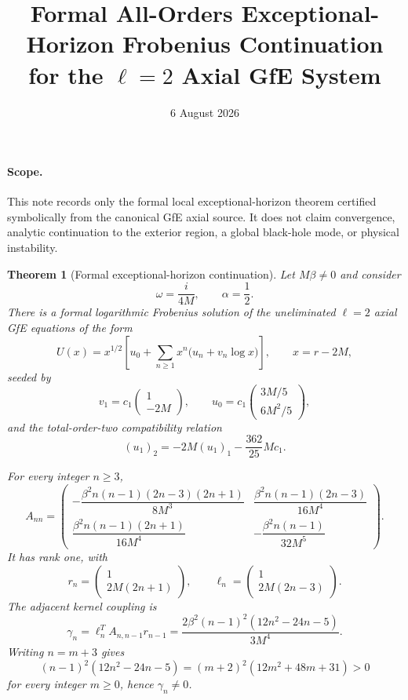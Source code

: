 \documentclass[11pt]{article}
\newtheorem{theorem}{Theorem}
\begin{document}
\title{Formal All-Orders Exceptional-Horizon Frobenius Continuation\\
for the $\ell=2$ Axial GfE System}
\date{6 August 2026}
\maketitle

\paragraph{Scope.}
This note records only the formal local exceptional-horizon theorem
certified symbolically from the canonical GfE axial source. It does not
claim convergence, analytic continuation to the exterior region, a
global black-hole mode, or physical instability.

\begin{theorem}[Formal exceptional-horizon continuation]
Let $M\beta\neq0$ and consider
\[
  \omega=\frac{i}{4M},
  \qquad
  \alpha=\frac12 .
\]
There is a formal logarithmic Frobenius solution of the uneliminated
$\ell=2$ axial GfE equations of the form
\[
  U(x)
  =
  x^{1/2}
  \left[
    u_0+
    \sum_{n\ge1}x^n
      \bigl(u_n+v_n\log x\bigr)
  \right],
  \qquad x=r-2M,
\]
seeded by
\[
  v_1
  =
  c_1
  \begin{pmatrix}
    1\\-2M
  \end{pmatrix},
  \qquad
  u_0
  =
  c_1
  \begin{pmatrix}
    3M/5\\6M^2/5
  \end{pmatrix},
\]
and the total-order-two compatibility relation
\[
  (u_1)_2
  =
  -2M(u_1)_1-\frac{362}{25}Mc_1 .
\]

For every integer $n\ge3$,
\[
A_{nn}
=
\begin{pmatrix}
-\dfrac{\beta^2n(n-1)(2n-3)(2n+1)}{8M^3}
&
 \dfrac{\beta^2n(n-1)(2n-3)}{16M^4}
\\[6pt]
 \dfrac{\beta^2n(n-1)(2n+1)}{16M^4}
&
-\dfrac{\beta^2n(n-1)}{32M^5}
\end{pmatrix}.
\]
It has rank one, with
\[
r_n=
\begin{pmatrix}
1\\2M(2n+1)
\end{pmatrix},
\qquad
\ell_n=
\begin{pmatrix}
1\\2M(2n-3)
\end{pmatrix}.
\]
The adjacent kernel coupling is
\[
\gamma_n
=
\ell_n^{T}A_{n,n-1}r_{n-1}
=
\frac{
2\beta^2(n-1)^2(12n^2-24n-5)
}{
3M^4
}.
\]
Writing $n=m+3$ gives
\[
(n-1)^2(12n^2-24n-5)
=
(m+2)^2(12m^2+48m+31)>0
\]
for every integer $m\ge0$, hence $\gamma_n\neq0$.


\end{theorem}
\end{document}
